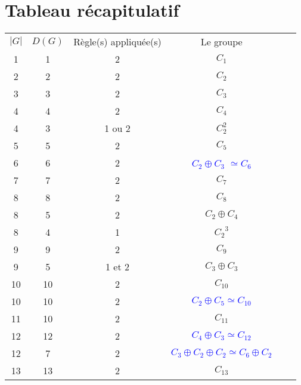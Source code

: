 \documentclass[12pt, openany]{report}
\begin{document}
\section{Tableau récapitulatif}\label{umlauts}

 \newlength\epaisLigne 
 \newcommand\Gline{\noalign{\global\epaisLigne\arrayrulewidth\global
                              \arrayrulewidth 0.08cm}
		    \hline\noalign{\global\arrayrulewidth\epaisLigne}} 
 \newcommand\Mline{\noalign{\global\epaisLigne\arrayrulewidth\global
                              \arrayrulewidth 0.3}
		    \hline\noalign{\global\arrayrulewidth\epaisLigne}}

\begin{tabular}{|c||c|c|c|c|c|}
\Gline  $|G|$ & $D(G)$& Règle(s) appliquée(s) & Le groupe\\
\Gline  1 & 1 & 2 & $ C_{1}$ \\
\hline  2 & 2 & 2 & $C_{2}$ \\
\hline  3 & 3 & 2 & $C_{3}$ \\  
\hline  4 & 4 & 2 & $C_{4}$ \\ 
\hline  4 & 3 & 1 ou 2 & $C_{2}^{2}$\\
\hline  5 & 5 & 2 & $C_{5}$ \\
\hline  6 & 6 & 2 &  \textcolor{blue}{$C_{2} \oplus C_{3}$ $\simeq C_{6}$} \\
\hline  7 & 7 & 2 & $C_{7}$ \\
\hline  8 & 8 & 2 & $C_{8}$  \\
\hline  8 & 5 & 2 & $ C_{2} \oplus C_{4}$ \\
\hline  8 & 4 & 1 & ${C_{2}}^{3}$ \\
\hline  9 & 9 & 2 & $ C_{9}$ \\
\hline  9 & 5 & 1 et 2& $ C_{3} \oplus C_{3}$\\
\hline  10 & 10 & 2 & $C_{10}$ \\
\hline  10 & 10 & 2 & \textcolor{blue}{$C_{2} \oplus C_{5} \simeq C_{10}$} \\
\hline  11& 10 & 2 & $C_{11}$\\
\hline  12 & 12 & 2 & \textcolor{blue} {$C_{4} \oplus C_{3} \simeq C_{12}$} \\
\hline  12 & 7 & 2 & \textcolor{blue}{$ C_{3}\oplus C_{2} \oplus C_{2} \simeq C_{6} \oplus C_{2}$}   \\
\hline  13 & 13 & 2 & $C_{13}$\\

\end{tabular}
\end{document}
